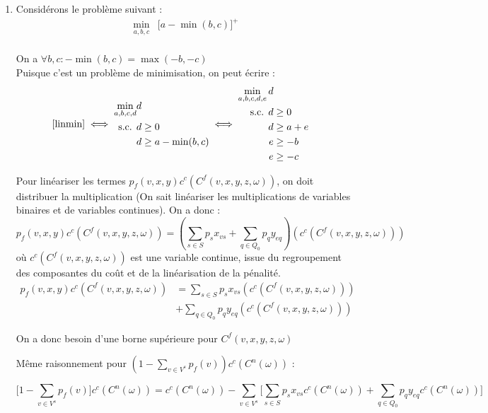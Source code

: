 \documentclass[a4paper,12pt]{article}
\begin{document}
\begin {enumerate}
\item{
    Considérons le problème suivant :
    \begin{equation}
        \begin{aligned}
            \min _{a, b, c} & \lbrack a - \min(b, c) \rbrack^+ \\
        \end{aligned}
        \label{linmin}
    \end{equation}

    On a $ \forall b, c : -\min(b, c) = \max(-b, -c) $ \\
    Puisque c'est un problème de minimisation, on peut écrire :
    \begin{equation}
        \eqref{linmin} \iff
        \begin{aligned}
            \min _{a, b, c, d} & d \\
            \text{ s.c. } & d \geq 0 \\
            & d \geq a - \min(b, c) \\
        \end{aligned}
        \iff
        \begin{aligned}
            \min _{a, b, c, d, e} d \\
            \text{ s.c. }
            d &\geq 0 \\
            d &\geq a + e \\
            e &\geq -b \\
            e &\geq -c \\   
        \end{aligned}
    \end{equation}


    Pour linéariser les termes $p_f(v, x, y) c^c(C^f(v, x, y, z ,\omega))$, on doit distribuer la multiplication
    (On sait linéariser les multiplications de variables binaires et de variables continues). On a donc :
    $$ p_f(v, x, y) c^c(C^f(v, x, y, z ,\omega)) = (\sum _ {s \in S} p_s x_{vs} + \sum _{q \in Q_0} p_q y _{eq}) (c^c(C^f(v, x, y, z ,\omega)))  $$
    où $c^c(C^f(v, x, y, z ,\omega))$ est une variable continue, issue du regroupement des composantes du coût et de la linéarisation de la pénalité.
    $$
    \begin{aligned}
        p_f(v, x, y) c^c(C^f(v, x, y, z ,\omega)) &= \sum _ {s \in S} p_s x_{vs} (c^c(C^f(v, x, y, z ,\omega))) \\
        &+ \sum _{q \in Q_0} p_q y _{eq} (c^c(C^f(v, x, y, z ,\omega)))
    \end{aligned}
    $$

    On a donc besoin d'une borne supérieure pour $C^f(v, x, y, z ,\omega)$

    Même raisonnement pour $(1 - \sum _{v \in V^s} p_f(v)) c^c(C^n(\omega))$ :

    $$ \lbrack 1 - \sum _{v \in V^s} p_f(v) \rbrack c^c(C^n(\omega)) = 
    c^c(C^n(\omega)) - \sum _{v \in V^s} \lbrack \sum _{s \in S} p_s x_{vs} c^c(C^n(\omega)) + \sum _{q \in Q_0} p_q y _{eq} c^c(C^n(\omega)) \rbrack  $$
}


\end{enumerate}
\end{document}
